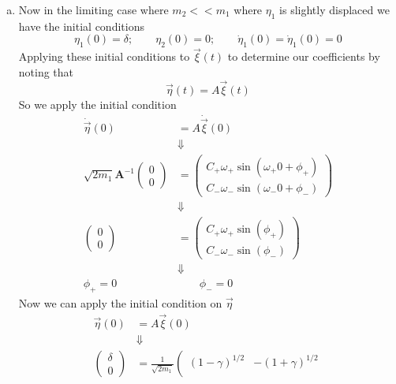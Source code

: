 \documentclass[11pt]{article}
\numberwithin{equation}{section}
\begin{document}
\begin{enumerate}[(a)]
\item Now in the limiting case where $m_2<<m_1$ where $\eta_1$ is slightly displaced we have 
the initial conditions 
$$\eta_1(0) = \delta; \qquad \eta_2(0) = 0; \qquad \dot{\eta}_{1}(0)=\dot{\eta}_{1}(0)=0$$
Applying these initial conditions to $\vec{\xi}(t)$ to determine our coefficients by noting 
that 
$$\vec{\eta}(t) = A\vec{\xi}(t)$$
So we apply the initial condition
\begin{align*}
\dot{\vec{\eta}}(0) &= A\dot{\vec{\xi}}(0)\\
&\Downarrow\\
            \sqrt{2m_1}\mathbf{A}^{-1}\left(\begin{array}{c}
                 0\\
                 0
                  \end{array}\right)
&=                 \left(\begin{array}{c}
                    C_+\omega_+\sin(\omega_{+}0+\phi_{+})\\
                    C_-\omega_-\sin(\omega_{-}0+\phi_{-})
                  \end{array}\right)\\
&\Downarrow\\
            \left(\begin{array}{c}
                 0\\
                 0
                  \end{array}\right)
&=                 \left(\begin{array}{c}
                    C_+\omega_+\sin(\phi_{+})\\
                    C_-\omega_-\sin(\phi_{-})
                  \end{array}\right)\\
&\Downarrow\\
\phi_+ = 0&\qquad\phi_-=0
\end{align*}
Now we can apply the initial condition on $\vec{\eta}$
\begin{align*}
\vec{\eta}(0) &= A\vec{\xi}(0)\\
&\Downarrow\\
            \left(\begin{array}{c}
                 \delta\\
                 0
                  \end{array}\right)
&= \frac{1}{\sqrt{2m_1}}\left(\begin{array}{cc} 
                         (1-\gamma)^{1/2}          &-(1+\gamma)^{1/2}\\

\end{array}
\end{align*}
\end{enumerate}
\end{document}
